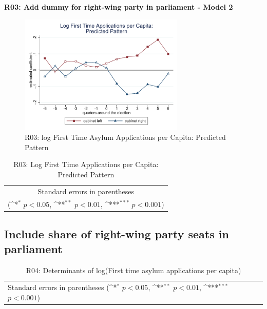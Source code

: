 \documentclass[10pt,a4paper]{scrartcl}
\begin{document}
\clearpage
\textbf{R03: Add dummy for right-wing party in parliament - Model 2}
\begin{figure}[!ht]
	\centering
	\includegraphics[width=0.7\textwidth]{figures_edited/app_graph2_R03.pdf}
	\caption{R03: log First Time Asylum Applications per Capita: Predicted Pattern}
\end{figure}

\begin{table}[!ht]\centering
	\footnotesize
	\renewcommand{\arraystretch}{1.2}
	\def\sym#1{\ifmmode^{#1}\else\(^{#1}\)\fi}
	\caption{R03: Log First Time Applications per Capita: Predicted Pattern}
	\begin{tabular}{l*{2}{c}}
		\hline\hline
		
		\hline\hline
		\multicolumn{3}{c}{\footnotesize Standard errors in parentheses} \\
		\multicolumn{3}{c}{\footnotesize (\sym{*} \(p<0.05\), \sym{**} \(p<0.01\), \sym{***} \(p<0.001\))} \\
	\end{tabular}
\end{table}




\clearpage
\FloatBarrier
\subsection{Include share of right-wing party seats in parliament}
\begin{table}[!ht]\centering
	\renewcommand{\arraystretch}{1.25}
	\small
	\def\sym#1{\ifmmode^{#1}\else\(^{#1}\)\fi}
	\caption{R04: Determinants of log(First time asylum applications per capita)}
	\begin{tabular}{l*{3}{c}}
		\hline\hline
		
		\hline\hline
		\multicolumn{4}{l}{\footnotesize Standard errors in parentheses (\sym{*} \(p<0.05\), \sym{**} \(p<0.01\), \sym{***} \(p<0.001\))}\\
	\end{tabular}
\end{table}
\end{document}
